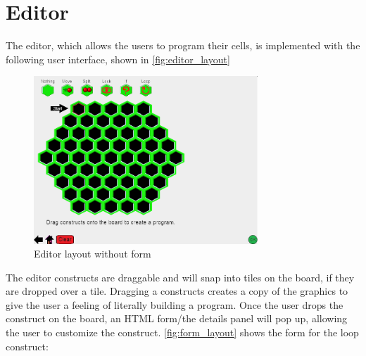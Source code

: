 \section{Editor}
\label{sec:editor}
The editor, which allows the users to program their cells, is implemented with the following user interface, shown in \autoref{fig:editor_layout}

\begin{figure}[ht]
	\includegraphics[width=0.75\textwidth]{img/editor_layout.png}
	\caption{Editor layout without form}
	\label{fig:editor_layout}
\end{figure}

The editor constructs are draggable and will snap into tiles on the board, if they are dropped over a tile.
Dragging a constructs creates a copy of the graphics to give the user a feeling of literally building a program.
Once the user drops the construct on the board, an HTML form/the details panel will pop up, allowing the user to customize the construct.
\autoref{fig:form_layout} shows the form for the loop construct:

